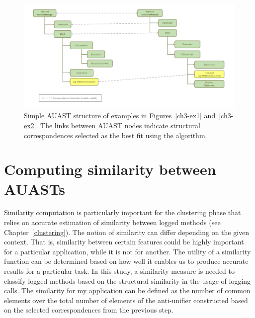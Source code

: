 \begin{figure}
  \centering\includegraphics [width = \textwidth]{Drawing4/FinalCorr.pdf}
  \caption{Simple AUAST structure of examples in Figures~\ref{ch3-ex1} and~\ref{ch3-ex2}. The links between AUAST nodes indicate structural correspondences selected as the best fit using the  algorithm.}
  \label{fig:AUASTs}
\end{figure}

\section{Computing similarity between AUASTs} \label{meth-similarity}
Similarity computation is particularly important for the clustering phase that relies on accurate estimation of similarity between logged methods (see Chapter~\ref{clustering}). The notion of similarity can differ depending on the given context. That is, similarity between certain features could be highly important for a particular application, while it is not for another. The utility of a similarity function can be determined based on how well it enables us to produce accurate results for a particular task. In this study, a similarity measure is needed to classify logged methods based on the structural similarity in the usage of logging calls. The similarity for my application can be defined as the number of common elements over the total number of elements of the anti-unifier constructed based on the selected correspondences from the previous step.

